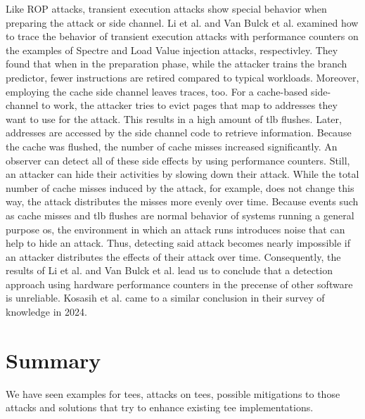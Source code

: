 Like ROP attacks, transient execution attacks show special behavior when
preparing the attack or side channel. Li et al. and Van Bulck et al. examined
how to trace the behavior of transient execution attacks with performance
counters on the examples of Spectre and Load Value injection attacks,
respectivley.\cite{li_detecting_2021, van_bulck_lvi_2020} They found that when
in the preparation phase, while the attacker trains the branch predictor, fewer
instructions are retired compared to typical workloads. Moreover, employing the
cache side channel leaves traces, too. For a cache-based side-channel to work,
the attacker tries to evict pages that map to addresses they want to use for the
attack. This results in a high amount of \gls{tlb} flushes. Later, addresses are
accessed by the side channel code to retrieve information. Because the cache was
flushed, the number of cache misses increased significantly. An observer can
detect all of these side effects by using performance counters. Still, an
attacker can hide their activities by slowing down their attack. While the total
number of cache misses induced by the attack, for example, does not change this
way, the attack distributes the misses more evenly over time. Because events
such as cache misses and \gls{tlb} flushes are normal behavior of systems
running a general purpose \gls{os}, the environment in which an attack runs
introduces noise that can help to hide an attack. Thus, detecting said attack
becomes nearly impossible if an attacker distributes the effects of their attack
over time. Consequently, the results of Li et al. and Van Bulck et al. lead us
to conclude that a detection approach using hardware performance counters in the
precense of other software is unreliable. Kosasih et al. came to a similar
conclusion in their survey of knowledge in 2024.\cite{kosasih2024sok}

\section{Summary}
\label{sec:20:summary}
We have seen examples for \glspl{tee}, attacks on \glspl{tee}, possible
mitigations to those attacks and solutions that try to enhance existing
\gls{tee} implementations. \\

